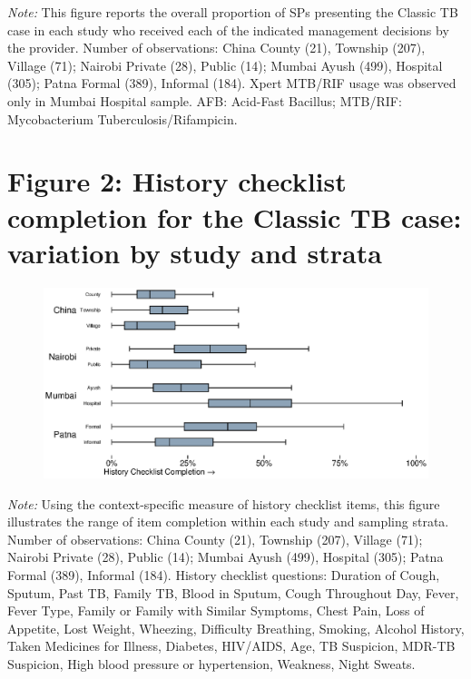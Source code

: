 \documentclass[fleqn,10pt]{wlscirep}
\begin{document}
\noindent\textit{Note:} This figure reports the overall proportion of SPs presenting the Classic TB case in each study who received each of the indicated management decisions by the provider. Number of observations: China County (21), Township (207), Village (71); Nairobi Private (28), Public (14); Mumbai Ayush (499), Hospital (305); Patna Formal (389), Informal (184). Xpert MTB/RIF usage was observed only in Mumbai Hospital sample. AFB: Acid-Fast Bacillus; MTB/RIF: Mycobacterium Tuberculosis/Rifampicin.

\newpage

\section*{Figure 2: History checklist completion for the Classic TB case: variation by study and strata}

\begin{figure}[h]
\centering
\includegraphics[width=1\textwidth]{f3.eps}
\end{figure}

\noindent\textit{Note:} Using the context-specific measure of history checklist items, this figure illustrates the range of item completion within each study and sampling strata. Number of observations: China County (21), Township (207), Village (71); Nairobi Private (28), Public (14); Mumbai Ayush (499), Hospital (305); Patna Formal (389), Informal (184). History checklist questions: Duration of Cough, Sputum, Past TB, Family TB, Blood in Sputum, Cough Throughout Day, Fever, Fever Type, Family or Family with Similar Symptoms, Chest Pain, Loss of Appetite, Lost Weight, Wheezing, Difficulty Breathing, Smoking, Alcohol History, Taken Medicines for Illness, Diabetes, HIV/AIDS, Age, TB Suspicion, MDR-TB Suspicion, High blood pressure or hypertension, Weakness, Night Sweats.

\newpage
\end{document}

